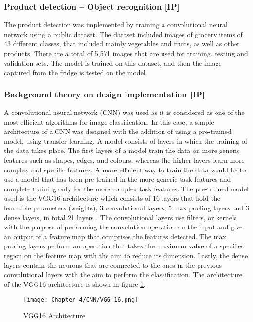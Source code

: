\subsubsection{Product detection – Object recognition [IP]}

The product detection was implemented by training a convolutional neural network using a public dataset.
The dataset included images of grocery items of 43 different classes, that included mainly vegetables and fruits, as well as other products.
There are a total of 5,571 images that are used for training, testing and validation sets.
The model is trained on this dataset, and then the image captured from the fridge is tested on the model.

\subsubsection{Background theory on design implementation [IP]}

A convolutional neural network (CNN) was used as it is considered as one of the most efficient algorithms for image classification.
In this case, a simple architecture of a CNN was designed with the addition of using a pre-trained model, using transfer learning.
A model consists of layers in which the training of the data takes place.
The first layers of a model train the data on more generic features such as shapes, edges, and colours, whereas the higher layers learn more complex and specific features.
A more efficient way to train the data would be to use a model that has been pre-trained in the more generic task features and complete training only for the more complex task features.
The pre-trained model used is the VGG16 architecture which consists of 16 layers that hold the learnable parameters (weights), 3 convolutional layers, 5 max pooling layers and 3 dense layers, in total 21 layers \cite{VGG16overview}.
The convolutional layers use filters, or kernels with the purpose of performing the convolution operation on the input and give an output of a feature map that comprises the features detected.
The max pooling layers perform an operation that takes the maximum value of a specified region on the feature map with the aim to reduce its dimension.
Lastly, the dense layers contain the neurons that are connected to the ones in the previous convolutional layers with the aim to perform the classification.
The architecture of the VGG16 architecture is shown in figure \ref{fig:cnn}.

\begin{figure}[H]        
    \centering
    \texttt{[image: Chapter 4/CNN/VGG-16.png]}
    \caption{VGG16 Architecture \cite{VGG16overview}}
    \label{fig:cnn}
\end{figure} 

